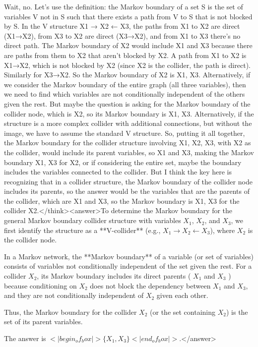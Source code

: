Wait, no. Let's use the definition: the Markov boundary of a set S is the set of variables V not in S such that there exists a path from V to S that is not blocked by S. In the V structure X1 → X2 ← X3, the paths from X1 to X2 are direct (X1→X2), from X3 to X2 are direct (X3→X2), and from X1 to X3 there's no direct path. The Markov boundary of {X2} would include X1 and X3 because there are paths from them to X2 that aren't blocked by X2. A path from X1 to X2 is X1→X2, which is not blocked by X2 (since X2 is the collider, the path is direct). Similarly for X3→X2. So the Markov boundary of {X2} is {X1, X3}. Alternatively, if we consider the Markov boundary of the entire graph (all three variables), then we need to find which variables are not conditionally independent of the others given the rest. But maybe the question is asking for the Markov boundary of the collider node, which is X2, so its Markov boundary is {X1, X3}. Alternatively, if the structure is a more complex collider with additional connections, but without the image, we have to assume the standard V structure. So, putting it all together, the Markov boundary for the collider structure involving X1, X2, X3, with X2 as the collider, would include its parent variables, so X1 and X3, making the Markov boundary {X1, X3} for X2, or if considering the entire set, maybe the boundary includes the variables connected to the collider. But I think the key here is recognizing that in a collider structure, the Markov boundary of the collider node includes its parents, so the answer would be the variables that are the parents of the collider, which are X1 and X3, so the Markov boundary is {X1, X3} for the collider X2.</think><answer>To determine the Markov boundary for the general Markov boundary collider structure with variables \( X_1 \), \( X_2 \), and \( X_3 \), we first identify the structure as a **V-collider** (e.g., \( X_1 \to X_2 \leftarrow X_3 \)), where \( X_2 \) is the collider node.  

In a Markov network, the **Markov boundary** of a variable (or set of variables) consists of variables not conditionally independent of the set given the rest. For a collider \( X_2 \), its Markov boundary includes its direct parents ( \( X_1 \) and \( X_3 \) ) because conditioning on \( X_2 \) does not block the dependency between \( X_1 \) and \( X_3 \), and they are not conditionally independent of \( X_2 \) given each other.  

Thus, the Markov boundary for the collider \( X_2 \) (or the set containing \( X_2 \)) is the set of its parent variables.  

The answer is \(<|begin_of_box|>\{X_1, X_3\}<|end_of_box|>\).</answer>